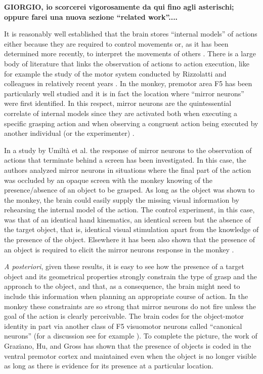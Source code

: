 {\bf GIORGIO, io scorcerei vigorosamente da qui fino agli asterischi;
oppure farei una nuova sezione ``related work''....}

It is reasonably well established that the brain stores ``internal
models'' of actions either because they are required to control
movements or, as it has been determined more recently, to interpret
the movements of others \cite{kawato-99, wolpert-03, mussaivaldi-00,
lackner-98}. There is a large body of literature that links the
observation of actions to action execution, like for example the study
of the motor system conducted by Rizzolatti and colleagues in
relatively recent years
\cite{rizzolatti-04,gallese-96,rizzolatti-01}. In the monkey, premotor
area F5 has been particularly well studied and it is in fact the
location where ``mirror neurons'' were first identified. In this
respect, mirror neurons are the quintessential correlate of internal
models since they are activated both when executing a specific
grasping action and when observing a congruent action being executed
by another individual (or the experimenter) \cite{fadiga-00}.

In a study by Umilt\`a et al. \cite{umilta-01} the response of mirror
neurons to the observation of actions that terminate behind a screen
has been investigated. In this case, the authors analyzed mirror
neurons in situations where the final part of the action was occluded
by an opaque screen with the monkey knowing of the presence/absence of
an object to be grasped. As long as the object was shown to the
monkey, the brain could easily supply the missing visual information
by rehearsing the internal model of the action. The control
experiment, in this case, was that of an identical hand kinematics, an
identical screen but the absence of the target object, that is,
identical visual stimulation apart from the knowledge of the presence
of the object. Elsewhere it has been also shown that the presence of
an object is required to elicit the mirror neurons response in the
monkey \cite{gallese-96}.

{\em A posteriori}, given these results, it is easy to see how the
presence of a target object and its geometrical properties strongly
constrain the type of grasp and the approach to the object, and that,
as a consequence, the brain might need to include this information
when planning an appropriate course of action. In the monkey these
constraints are so strong that mirror neurons do not fire unless the
goal of the action is clearly perceivable. The brain codes for the
object-motor identity in part via another class of F5 visuomotor
neurons called ``canonical neurons'' (for a discussion see for example
\cite{metta-06}). To complete the picture, the work of Graziano,
Hu, and Gross \cite{graziano-97} has shown that the presence of
objects is coded in the ventral premotor cortex and maintained even
when the object is no longer visible as long as there is evidence for
its presence at a particular location.

